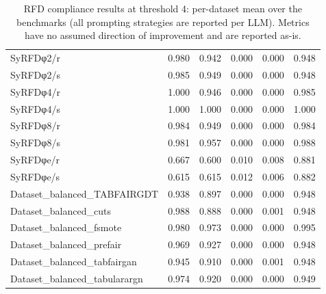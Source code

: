 \begin{table}[t]
\begin{tabular}{lrrrrr}
\midrule
SyRFDφ2/r & 0.980 & 0.942 & 0.000 & 0.000 & 0.948 \\
SyRFDφ2/s & 0.985 & 0.949 & 0.000 & 0.000 & 0.948 \\
SyRFDφ4/r & 1.000 & 0.946 & 0.000 & 0.000 & 0.985 \\
SyRFDφ4/s & 1.000 & 1.000 & 0.000 & 0.000 & 1.000 \\
SyRFDφ8/r & 0.984 & 0.949 & 0.000 & 0.000 & 0.984 \\
SyRFDφ8/s & 0.981 & 0.957 & 0.000 & 0.000 & 0.988 \\
SyRFDφe/r & 0.667 & 0.600 & 0.010 & 0.008 & 0.881 \\
SyRFDφe/s & 0.615 & 0.615 & 0.012 & 0.006 & 0.882 \\
\midrule
Dataset\_balanced\_TABFAIRGDT & 0.938 & 0.897 & 0.000 & 0.000 & 0.948 \\
Dataset\_balanced\_cuts & 0.988 & 0.888 & 0.000 & 0.001 & 0.948 \\
Dataset\_balanced\_fsmote & 0.980 & 0.973 & 0.000 & 0.000 & 0.995 \\
Dataset\_balanced\_prefair & 0.969 & 0.927 & 0.000 & 0.000 & 0.948 \\
Dataset\_balanced\_tabfairgan & 0.945 & 0.910 & 0.000 & 0.001 & 0.948 \\
Dataset\_balanced\_tabularargn & 0.974 & 0.920 & 0.000 & 0.000 & 0.949 \\
\bottomrule
\end{tabular}
\caption{RFD compliance results at threshold 4: per-dataset mean over the benchmarks (all prompting strategies are reported per LLM). Metrics have no assumed direction of improvement and are reported as-is.}
\label{tab:rfdcompliance_main_thr4}
\end{table}